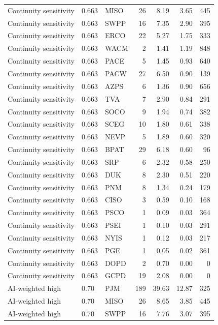 \documentclass[12pt]{article}
\begin{document}
\begin{landscape}
\begin{longtable}{ll l r r r r}
Continuity sensitivity & 0.663 & MISO & 26 & 8.19 & 3.65 & 445 \\
Continuity sensitivity & 0.663 & SWPP & 16 & 7.35 & 2.90 & 395 \\
Continuity sensitivity & 0.663 & ERCO & 22 & 5.27 & 1.75 & 333 \\
Continuity sensitivity & 0.663 & WACM & 2 & 1.41 & 1.19 & 848 \\
Continuity sensitivity & 0.663 & PACE & 5 & 1.45 & 0.93 & 640 \\
Continuity sensitivity & 0.663 & PACW & 27 & 6.50 & 0.90 & 139 \\
Continuity sensitivity & 0.663 & AZPS & 6 & 1.36 & 0.90 & 656 \\
Continuity sensitivity & 0.663 & TVA & 7 & 2.90 & 0.84 & 291 \\
Continuity sensitivity & 0.663 & SOCO & 9 & 1.94 & 0.74 & 382 \\
Continuity sensitivity & 0.663 & SCEG & 10 & 1.80 & 0.61 & 338 \\
Continuity sensitivity & 0.663 & NEVP & 5 & 1.89 & 0.60 & 320 \\
Continuity sensitivity & 0.663 & BPAT & 29 & 6.18 & 0.60 & 96 \\
Continuity sensitivity & 0.663 & SRP & 6 & 2.32 & 0.58 & 250 \\
Continuity sensitivity & 0.663 & DUK & 8 & 2.30 & 0.51 & 220 \\
Continuity sensitivity & 0.663 & PNM & 8 & 1.34 & 0.24 & 179 \\
Continuity sensitivity & 0.663 & CISO & 3 & 0.59 & 0.10 & 168 \\
Continuity sensitivity & 0.663 & PSCO & 1 & 0.09 & 0.03 & 364 \\
Continuity sensitivity & 0.663 & PSEI & 1 & 0.10 & 0.03 & 291 \\
Continuity sensitivity & 0.663 & NYIS & 1 & 0.12 & 0.03 & 217 \\
Continuity sensitivity & 0.663 & PGE & 1 & 0.05 & 0.02 & 361 \\
Continuity sensitivity & 0.663 & DOPD & 2 & 0.70 & 0.00 & 0 \\
Continuity sensitivity & 0.663 & GCPD & 19 & 2.08 & 0.00 & 0 \\
AI-weighted high & 0.70 & PJM & 189 & 39.63 & 12.87 & 325 \\
AI-weighted high & 0.70 & MISO & 26 & 8.65 & 3.85 & 445 \\
AI-weighted high & 0.70 & SWPP & 16 & 7.76 & 3.07 & 395 \\

\end{longtable}
\end{landscape}
\end{document}
